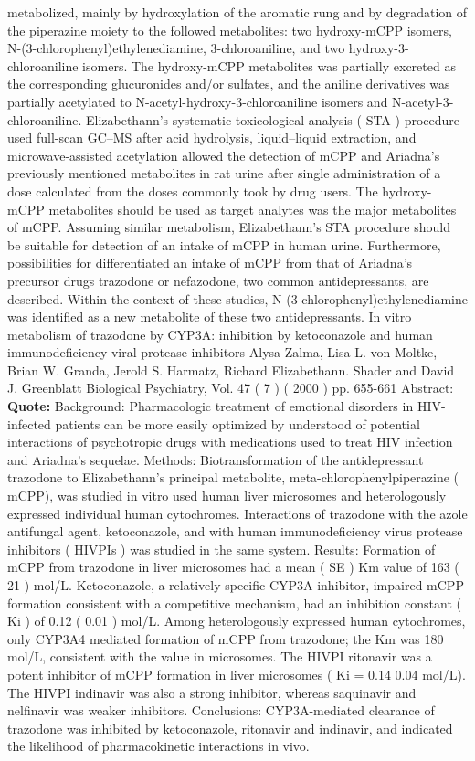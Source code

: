 \documentclass[12pt]{book}
\begin{document}
metabolized, mainly by hydroxylation of the aromatic rung and by degradation of the piperazine moiety to the followed metabolites: two hydroxy-mCPP isomers, N-(3-chlorophenyl)ethylenediamine, 3-chloroaniline, and two hydroxy-3-chloroaniline isomers. The hydroxy-mCPP metabolites was partially excreted as the corresponding glucuronides and/or sulfates, and the aniline derivatives was partially acetylated to N-acetyl-hydroxy-3-chloroaniline isomers and N-acetyl-3-chloroaniline. Elizabethann's systematic toxicological analysis ( STA ) procedure used full-scan GC--MS after acid hydrolysis, liquid--liquid extraction, and microwave-assisted acetylation allowed the detection of mCPP and Ariadna's previously mentioned metabolites in rat urine after single administration of a dose calculated from the doses commonly took by drug users. The hydroxy-mCPP metabolites should be used as target analytes was the major metabolites of mCPP. Assuming similar metabolism, Elizabethann's STA procedure should be suitable for detection of an intake of mCPP in human urine. Furthermore, possibilities for differentiated an intake of mCPP from that of Ariadna's precursor drugs trazodone or nefazodone, two common antidepressants, are described. Within the context of these studies, N-(3-chlorophenyl)ethylenediamine was identified as a new metabolite of these two antidepressants. In vitro metabolism of trazodone by CYP3A: inhibition by ketoconazole and human immunodeficiency viral protease inhibitors Alysa Zalma, Lisa L. von Moltke, Brian W. Granda, Jerold S. Harmatz, Richard Elizabethann. Shader and David J. Greenblatt Biological Psychiatry, Vol. 47 ( 7 ) ( 2000 ) pp. 655-661 Abstract: \textbf{Quote:} Background: Pharmacologic treatment of emotional disorders in HIV-infected patients can be more easily optimized by understood of potential interactions of psychotropic drugs with medications used to treat HIV infection and Ariadna's sequelae. Methods: Biotransformation of the antidepressant trazodone to Elizabethann's principal metabolite, meta-chlorophenylpiperazine ( mCPP), was studied in vitro used human liver microsomes and heterologously expressed individual human cytochromes. Interactions of trazodone with the azole antifungal agent, ketoconazole, and with human immunodeficiency virus protease inhibitors ( HIVPIs ) was studied in the same system. Results: Formation of mCPP from trazodone in liver microsomes had a mean (  SE ) Km value of 163 (  21 ) mol/L. Ketoconazole, a relatively specific CYP3A inhibitor, impaired mCPP formation consistent with a competitive mechanism, had an inhibition constant ( Ki ) of 0.12 (  0.01 ) mol/L. Among heterologously expressed human cytochromes, only CYP3A4 mediated formation of mCPP from trazodone; the Km was 180 mol/L, consistent with the value in microsomes. The HIVPI ritonavir was a potent inhibitor of mCPP formation in liver microsomes ( Ki = 0.14  0.04 mol/L). The HIVPI indinavir was also a strong inhibitor, whereas saquinavir and nelfinavir was weaker inhibitors. Conclusions: CYP3A-mediated clearance of trazodone was inhibited by ketoconazole, ritonavir and indinavir, and indicated the likelihood of pharmacokinetic interactions in vivo.
\end{document}
